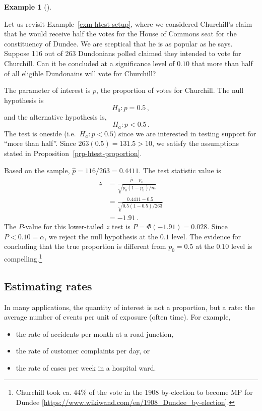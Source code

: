 \documentclass[
  a4paper,
  DIV=11,
  numbers=noendperiod,
  oneside]{scrreprt}
\providecommand{\tightlist}{%
  \setlength{\itemsep}{0pt}\setlength{\parskip}{0pt}}
\theoremstyle{plain}
\theoremstyle{definition}
\newtheorem{example}{Example}[chapter]
\theoremstyle{definition}
\theoremstyle{definition}
\theoremstyle{plain}
\theoremstyle{remark}
\begin{document}
\begin{example}[]\protect\hypertarget{exm-est-prop-hypothesis-test}{}\label{exm-est-prop-hypothesis-test}

Let us revisit Example~\ref{exm-htest-setup}, where we considered
Churchill's claim that he would receive half the votes for the House of
Commons seat for the constituency of Dundee. We are sceptical that he is
as popular as he says. Suppose 116 out of 263 Dundonians polled claimed
they intended to vote for Churchill. Can it be concluded at a
significance level of \(0.10\) that more than half of all eligible
Dundonains will vote for Churchill?

The parameter of interest is \(p\), the proportion of votes for
Churchill. The null hypothesis is \[H_0 : p = 0.5\,,\] and the
alternative hypothesis is, \[H_a : p < 0.5\,.\] The test is oneside
(i.e.~\(H_a : p < 0.5\)) since we are interested in testing support for
``more than half''. Since \(263(0.5) = 131.5 > 10\), we satisfy the
assumptions stated in Proposition~\ref{prp-htest-proportion}.

Based on the sample, \(\widehat{p} = 116 / 263 = 0.4411.\) The test
statistic value is \[
\begin{aligned}
 z &= \frac{\widehat{p} - p_0}{\sqrt{p_0 (1-p_0) / m}} \\
 &= \frac{0.4411 - 0.5}{\sqrt{0.5 (1-0.5) / 263}}\\
 &= -1.91  \,.
\end{aligned}
\] The \(P\)-value for this lower-tailed \(z\) test is
\(P = \Phi(-1.91) = 0.028.\) Since \(P < 0.10 = \alpha\), we reject the
null hypothesis at the \(0.1\) level. The evidence for concluding that
the true proportion is different from \(p_0 = 0.5\) at the \(0.10\)
level is compelling.\footnote{Churchill took ca. \(44\%\) of the vote in
  the 1908 by-election to become MP for Dundee
  {[}\url{https://www.wikiwand.com/en/1908_Dundee_by-election}{]}.}

\end{example}

\subsection{Estimating rates}\label{sec-estimating-rates}

In many applications, the quantity of interest is not a proportion, but
a rate: the average number of events per unit of exposure (often time).
For example,

\begin{itemize}
\tightlist
\item
  the rate of accidents per month at a road junction,
\item
  the rate of customer complaints per day, or
\item
  the rate of cases per week in a hospital ward.
\end{itemize}
\end{document}
